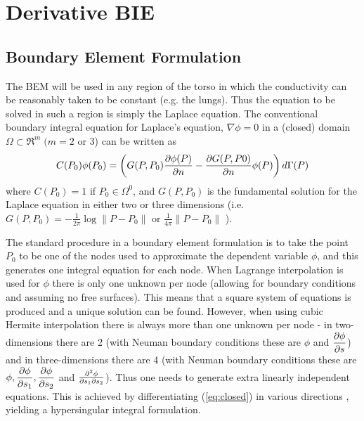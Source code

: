 \chapter{Derivative BIE}

\section{Boundary Element Formulation}

The BEM will be used in any region of the torso in which the conductivity can
be reasonably taken to be constant (e.g. the lungs).  Thus the equation to be
solved in such a region is simply the Laplace equation.  The conventional
boundary integral equation for Laplace's equation, $\nabla\phi = 0$ in a
(closed) domain $\Omega \subset \Re^{m}\; (m=2$ or 3) can be written as
\begin{equation}
 C(P_{0})\phi(P_{0}) =
 \left(G(P,P_{0}) \dfrac{\partial \phi(P)}{\partial n} - \dfrac{\partial G(P,P0)}{\partial n} \phi(P)\right)
 d\Gamma(P)
 \label{eq:closed}
\end{equation}
where $C(P_{0}) = 1$ if $P_{0}\in \Omega^{0}$, and $G(P,P_{0})$ is the
fundamental solution for the Laplace equation in either two or three
dimensions (i.e. $G(P,P_{0}) = -\frac{1}{2\pi}\log \parallel P
-P_{0}\parallel$ or $\frac{1}{4\pi}\parallel P-P_{0}\parallel$ ).

The standard procedure in a boundary element formulation is to take the point
$P_{0}$ to be one of the nodes used to approximate the dependent variable
$\phi$, and this generates one integral equation for each node.  When Lagrange
interpolation is used for $\phi$ there is only one unknown per node (allowing
for boundary conditions and assuming no free surfaces). This means that a
square system of equations is produced and a unique solution can be found.
However, when using cubic Hermite interpolation there is always more than one
unknown per node - in two-dimensions there are 2 (with Neuman boundary
conditions these are $\phi$ and $ \dfrac{\partial \phi}{\partial s} $) and in three-dimensions
there are 4 (with Neuman boundary conditions these are $\phi,
 \dfrac{\partial \phi}{\partial s_{1}} ,  \dfrac{\partial \phi}{\partial s_{2}} $ and $\frac{\partial^{2}\phi}{\partial
  s_{1}\partial s_{2}}$).  Thus one needs to generate extra linearly independent
equations.  This is achieved by differentiating (\ref{eq:closed}) in various
directions \cite{tomlinson:1996}, yielding a hypersingular integral
formulation.

